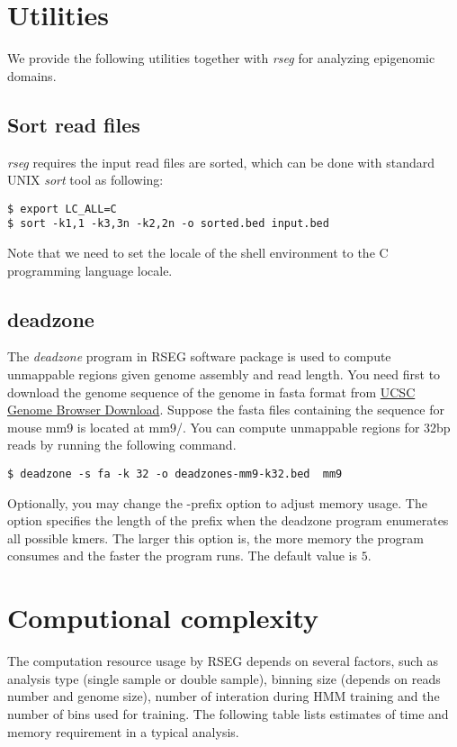\documentclass[11pt]{report}
\begin{document}
\section{Utilities}
\label{sec:utilities}

We provide the following utilities together with \textit{rseg} for
analyzing epigenomic domains.

\subsection{Sort read files}
\label{sec:sortbed}

\textit{rseg} requires the input read files are sorted, which can be
done with standard UNIX \textit{sort} tool as following:
\begin{verbatim}
$ export LC_ALL=C
$ sort -k1,1 -k3,3n -k2,2n -o sorted.bed input.bed
\end{verbatim}
Note that we need to set the locale of the shell environment to the C
programming language locale. 

\subsection{deadzone}
\label{sec:deadzone}
The \textit{deadzone} program in RSEG software package is used to compute
unmappable regions given genome assembly and read length. You need first to
download the genome sequence of the genome in fasta format from
\href{http://hgdownload.cse.ucsc.edu/downloads.html}{UCSC Genome Browser
  Download}. Suppose the fasta files containing the sequence for mouse mm9 is
located at mm9/. You can compute unmappable regions for 32bp reads by running
the following command. 

\begin{verbatim}
$ deadzone -s fa -k 32 -o deadzones-mm9-k32.bed  mm9
\end{verbatim}

Optionally, you may change the -prefix option to adjust memory usage. The option
specifies the length of the prefix when the deadzone program enumerates all
possible kmers. The larger this option is, the more memory the program consumes
and the faster the program runs. The default value is $5$.

\section{Computional complexity}
\label{sec:comp-compl}
The computation resource usage by RSEG depends on several factors,
such as analysis type (single sample or double sample), binning size
(depends on reads number and genome size), number of interation during
HMM training and the number of bins used for training. The following
table lists estimates of time and memory requirement in a typical
analysis. 
\end{document}
